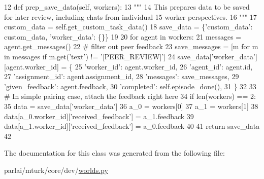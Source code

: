 \begin{DoxyCode}
12     \textcolor{keyword}{def }prep\_save\_data(self, workers):
13         \textcolor{stringliteral}{"""}
14 \textcolor{stringliteral}{        This prepares data to be saved for later review, including chats from individual}
15 \textcolor{stringliteral}{        worker perspectives.}
16 \textcolor{stringliteral}{        """}
17         custom\_data = self.get\_custom\_task\_data()
18         save\_data = \{\textcolor{stringliteral}{'custom\_data'}: custom\_data, \textcolor{stringliteral}{'worker\_data'}: \{\}\}
19 
20         \textcolor{keywordflow}{for} agent \textcolor{keywordflow}{in} workers:
21             messages = agent.get\_messages()
22             \textcolor{comment}{# filter out peer feedback}
23             save\_messages = [m \textcolor{keywordflow}{for} m \textcolor{keywordflow}{in} messages \textcolor{keywordflow}{if} m.get(\textcolor{stringliteral}{'text'}) != \textcolor{stringliteral}{'[PEER\_REVIEW]'}]
24             save\_data[\textcolor{stringliteral}{'worker\_data'}][agent.worker\_id] = \{
25                 \textcolor{stringliteral}{'worker\_id'}: agent.worker\_id,
26                 \textcolor{stringliteral}{'agent\_id'}: agent.id,
27                 \textcolor{stringliteral}{'assignment\_id'}: agent.assignment\_id,
28                 \textcolor{stringliteral}{'messages'}: save\_messages,
29                 \textcolor{stringliteral}{'given\_feedback'}: agent.feedback,
30                 \textcolor{stringliteral}{'completed'}: self.episode\_done(),
31             \}
32 
33         \textcolor{comment}{# In simple pairing case, attach the feedback right here}
34         \textcolor{keywordflow}{if} len(workers) == 2:
35             data = save\_data[\textcolor{stringliteral}{'worker\_data'}]
36             a\_0 = workers[0]
37             a\_1 = workers[1]
38             data[a\_0.worker\_id][\textcolor{stringliteral}{'received\_feedback'}] = a\_1.feedback
39             data[a\_1.worker\_id][\textcolor{stringliteral}{'received\_feedback'}] = a\_0.feedback
40 
41         \textcolor{keywordflow}{return} save\_data
42 
\end{DoxyCode}


The documentation for this class was generated from the following file\+:\begin{DoxyCompactItemize}
\item 
parlai/mturk/core/dev/\hyperlink{parlai_2mturk_2core_2dev_2worlds_8py}{worlds.\+py}\end{DoxyCompactItemize}
